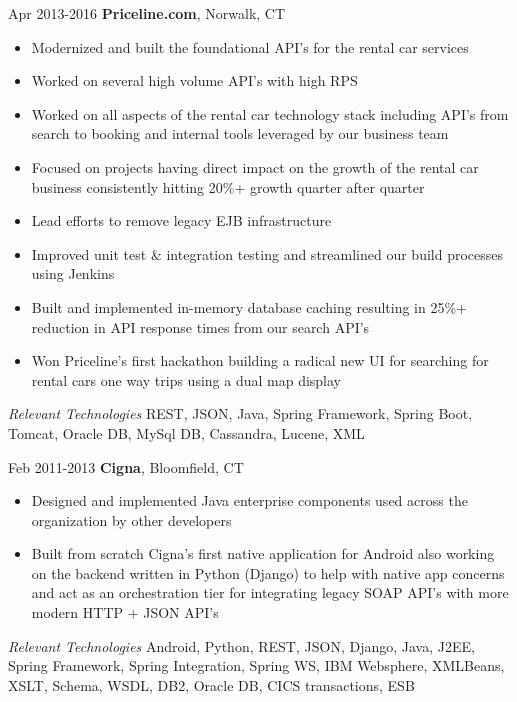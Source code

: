 \documentclass[a4paper,online]{adcv}
\begin{document}
\begin{adcvtabletwo}
  \adcvrowskip
  \adcvrowskip
   {Apr 2013-2016}
  {\textbf{Priceline.com}, Norwalk, CT}
  \begin{itemize}
    \item Modernized and built the foundational API's for the rental car services
    \item Worked on several high volume API's with high RPS
    \item Worked on all aspects of the rental car technology stack including API's from search to booking and internal tools leveraged by our business team
    \item Focused on projects having direct impact on the growth of the rental car business consistently hitting 20\%+ growth quarter after quarter
    \item Lead efforts to remove legacy EJB infrastructure
    \item Improved unit test \& integration testing and streamlined our build processes using Jenkins
    \item Built and implemented in-memory database caching resulting in 25\%+ reduction in API response times from our search API's
    \item Won Priceline's first hackathon building a radical new UI for searching for rental cars one way trips using a dual map display
  \end{itemize}
  \adcvrowskip
  \emph{Relevant Technologies} REST, JSON, Java, Spring Framework, Spring Boot, Tomcat, Oracle DB, MySql DB, Cassandra, Lucene, XML

  \adcvrowskip
  \adcvrowskip
   {Feb 2011-2013}
  {\textbf{Cigna}, Bloomfield, CT}
  \begin{itemize}
    \item Designed and implemented Java enterprise components used across the organization by other developers
    \item Built from scratch Cigna's first native application for Android also working on the backend written in Python (Django) to help with native app concerns and act as an orchestration tier for integrating legacy SOAP API's with more modern HTTP + JSON API's
  \end{itemize}
  \adcvrowskip
  \emph{Relevant Technologies} Android, Python, REST, JSON, Django, Java, J2EE, Spring Framework, Spring Integration, Spring WS, IBM Websphere, XMLBeans, XSLT, Schema, WSDL, DB2, Oracle DB, CICS transactions, ESB
  

\end{adcvtabletwo}
\end{document}
